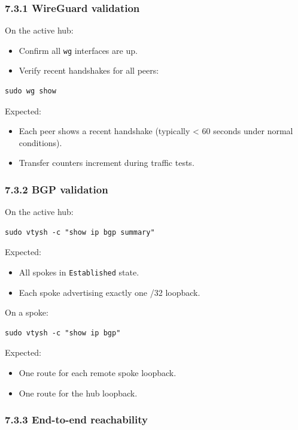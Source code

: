 \documentclass[11pt]{article}
\begin{document}
\subsubsection{7.3.1 WireGuard validation}
\label{sec:wg-validation-runbook}

On the active hub:
\begin{itemize}
  \item Confirm all \texttt{wg} interfaces are up.
  \item Verify recent handshakes for all peers:
\end{itemize}

\begin{verbatim}
sudo wg show
\end{verbatim}

Expected:
\begin{itemize}
  \item Each peer shows a recent handshake (typically < 60 seconds under normal conditions).
  \item Transfer counters increment during traffic tests.
\end{itemize}

\subsubsection{7.3.2 BGP validation}
\label{sec:bgp-validation-runbook}

On the active hub:
\begin{verbatim}
sudo vtysh -c "show ip bgp summary"
\end{verbatim}

Expected:
\begin{itemize}
  \item All spokes in \texttt{Established} state.
  \item Each spoke advertising exactly one /32 loopback.
\end{itemize}

On a spoke:
\begin{verbatim}
sudo vtysh -c "show ip bgp"
\end{verbatim}

Expected:
\begin{itemize}
  \item One route for each remote spoke loopback.
  \item One route for the hub loopback.
\end{itemize}

\subsubsection{7.3.3 End-to-end reachability}
\label{sec:end-to-end-validation-runbook}
\end{document}
